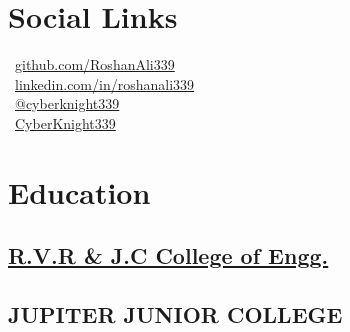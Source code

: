 \documentclass[]{roshan-resume}
\begin{document}
	
	
	
	
	\begin{minipage}[t]{0.33\textwidth} 
		
		
		\section{Social Links} 
		\faGithub \ \href{https://github.com/RoshanAli339}{github.com/RoshanAli339} \\
		\faLinkedinIn \  \href{https://www.linkedin.com/in/roshanali339/}{linkedin.com/in/roshanali339} \\
		\faYoutube \ \href{https://www.youtube.com/@cyberknight339}{@cyberknight339} \\
		\faMediumM \ \href{https://cyberknight339.medium.com}{CyberKnight339}
		
		
		\section{Education} 
		
		\subsection{\href{https://rvrjcce.ac.in/}{R.V.R \& J.C College of Engg.}}
		\sectionsep
		
		\subsection{JUPITER JUNIOR COLLEGE}
		\sectionsep
		

\end{minipage}
\end{document}
